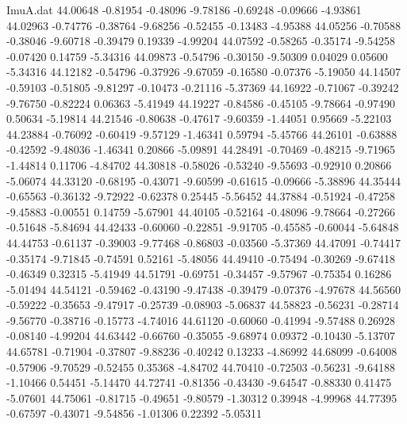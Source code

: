 \begin{filecontents}{ImuA.dat}
  44.00648   -0.81954   -0.48096   -9.78186   -0.69248   -0.09666   -4.93861
  44.02963   -0.74776   -0.38764   -9.68256   -0.52455   -0.13483   -4.95388
  44.05256   -0.70588   -0.38046   -9.60718   -0.39479    0.19339   -4.99204
  44.07592   -0.58265   -0.35174   -9.54258   -0.07420    0.14759   -5.34316
  44.09873   -0.54796   -0.30150   -9.50309    0.04029    0.05600   -5.34316
  44.12182   -0.54796   -0.37926   -9.67059   -0.16580   -0.07376   -5.19050
  44.14507   -0.59103   -0.51805   -9.81297   -0.10473   -0.21116   -5.37369
  44.16922   -0.71067   -0.39242   -9.76750   -0.82224    0.06363   -5.41949
  44.19227   -0.84586   -0.45105   -9.78664   -0.97490    0.50634   -5.19814
  44.21546   -0.80638   -0.47617   -9.60359   -1.44051    0.95669   -5.22103
  44.23884   -0.76092   -0.60419   -9.57129   -1.46341    0.59794   -5.45766
  44.26101   -0.63888   -0.42592   -9.48036   -1.46341    0.20866   -5.09891
  44.28491   -0.70469   -0.48215   -9.71965   -1.44814    0.11706   -4.84702
  44.30818   -0.58026   -0.53240   -9.55693   -0.92910    0.20866   -5.06074
  44.33120   -0.68195   -0.43071   -9.60599   -0.61615   -0.09666   -5.38896
  44.35444   -0.65563   -0.36132   -9.72922   -0.62378    0.25445   -5.56452
  44.37884   -0.51924   -0.47258   -9.45883   -0.00551    0.14759   -5.67901
  44.40105   -0.52164   -0.48096   -9.78664   -0.27266   -0.51648   -5.84694
  44.42433   -0.60060   -0.22851   -9.91705   -0.45585   -0.60044   -5.64848
  44.44753   -0.61137   -0.39003   -9.77468   -0.86803   -0.03560   -5.37369
  44.47091   -0.74417   -0.35174   -9.71845   -0.74591    0.52161   -5.48056
  44.49410   -0.75494   -0.30269   -9.67418   -0.46349    0.32315   -5.41949
  44.51791   -0.69751   -0.34457   -9.57967   -0.75354    0.16286   -5.01494
  44.54121   -0.59462   -0.43190   -9.47438   -0.39479   -0.07376   -4.97678
  44.56560   -0.59222   -0.35653   -9.47917   -0.25739   -0.08903   -5.06837
  44.58823   -0.56231   -0.28714   -9.56770   -0.38716   -0.15773   -4.74016
  44.61120   -0.60060   -0.41994   -9.57488    0.26928   -0.08140   -4.99204
  44.63442   -0.66760   -0.35055   -9.68974    0.09372   -0.10430   -5.13707
  44.65781   -0.71904   -0.37807   -9.88236   -0.40242    0.13233   -4.86992
  44.68099   -0.64008   -0.57906   -9.70529   -0.52455    0.35368   -4.84702
  44.70410   -0.72503   -0.56231   -9.64188   -1.10466    0.54451   -5.14470
  44.72741   -0.81356   -0.43430   -9.64547   -0.88330    0.41475   -5.07601
  44.75061   -0.81715   -0.49651   -9.80579   -1.30312    0.39948   -4.99968
  44.77395   -0.67597   -0.43071   -9.54856   -1.01306    0.22392   -5.05311

\end{filecontents}
